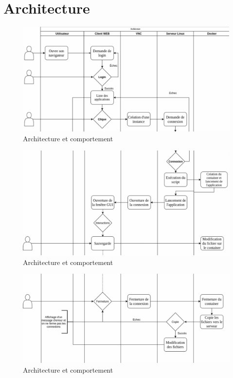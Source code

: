 \section{Architecture}
\begin{landscape}
	\begin{figure}[H]
		\centering
		\includegraphics[scale=0.55]{images/VNC&server_1.png}
		\caption{Architecture et comportement}
		\label{fig:arch1}
	\end{figure}
	\begin{figure}[H]
		\centering
		\includegraphics[scale=0.55]{images/VNC&server_2.png}
		\caption{Architecture et comportement}
		\label{fig:arch2}
	\end{figure}
	\begin{figure}[H]
		\centering
		\includegraphics[scale=0.55]{images/VNC&server_3.png}
		\caption{Architecture et comportement}
		\label{fig:arch3}
	\end{figure}
		
\end{landscape}

